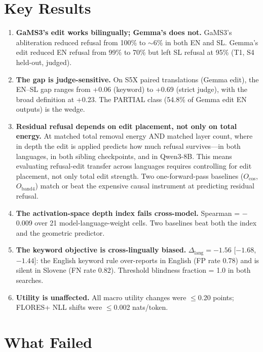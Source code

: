 \documentclass[11pt,letterpaper]{article}
\begin{document}
\section{Key Results}

\begin{enumerate}
\item \textbf{GaMS3's edit works bilingually; Gemma's does not.} GaMS3's abliteration reduced refusal from 100\% to $\sim$6\% in both EN and SL. Gemma's edit reduced EN refusal from 99\% to 70\% but left SL refusal at 95\% (T1, S4 held-out, judged).

\item \textbf{The gap is judge-sensitive.} On S5X paired translations (Gemma edit), the EN--SL gap ranges from +0.06 (keyword) to +0.69 (strict judge), with the broad definition at +0.23. The PARTIAL class (54.8\% of Gemma edit EN outputs) is the wedge.

\item \textbf{Residual refusal depends on edit placement, not only on total energy.} At matched total removal energy AND matched layer count, where in depth the edit is applied predicts how much refusal survives---in both languages, in both sibling checkpoints, and in Qwen3-8B. This means evaluating refusal-edit transfer across languages requires controlling for edit placement, not only total edit strength. Two one-forward-pass baselines ($O_\mathrm{cos}$, $O_\mathrm{band4}$) match or beat the expensive causal instrument at predicting residual refusal.

\item \textbf{The activation-space depth index fails cross-model.} Spearman = $-$0.009 over 21 model-language-weight cells. Two baselines beat both the index and the geometric predictor.

\item \textbf{The keyword objective is cross-lingually biased.} $\Delta_\mathrm{lang} = -1.56$ [$-1.68$, $-1.44$]: the English keyword rule over-reports in English (FP rate 0.78) and is silent in Slovene (FN rate 0.82). Threshold blindness fraction = 1.0 in both searches.

\item \textbf{Utility is unaffected.} All macro utility changes were $\leq$0.20 points; FLORES+ NLL shifts were $\leq$0.002 nats/token.
\end{enumerate}

\section{What Failed}
\end{document}
